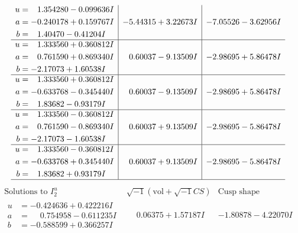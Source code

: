 \documentclass[1p]{elsarticle_modified}
\theoremstyle{definition}
\newcommand{\I}{\sqrt{-1}}
\begin{document}
$$\begin{array}{c|c|c}
\begin{aligned}
u &= \phantom{-}1.354280 - 0.099636 I \\
a &= -0.240178 + 0.159767 I \\
b &= \phantom{-}1.40470 - 0.41204 I\end{aligned}
 & -5.44315 + 3.22673 I & -7.05526 - 3.62956 I \\ \hline\begin{aligned}
u &= \phantom{-}1.333560 + 0.360812 I \\
a &= \phantom{-}0.761590 + 0.869340 I \\
b &= -2.17073 + 1.60538 I\end{aligned}
 & \phantom{-}0.60037 - 9.13509 I & -2.98695 + 5.86478 I \\ \hline\begin{aligned}
u &= \phantom{-}1.333560 + 0.360812 I \\
a &= -0.633768 - 0.345440 I \\
b &= \phantom{-}1.83682 - 0.93179 I\end{aligned}
 & \phantom{-}0.60037 - 9.13509 I & -2.98695 + 5.86478 I \\ \hline\begin{aligned}
u &= \phantom{-}1.333560 - 0.360812 I \\
a &= \phantom{-}0.761590 - 0.869340 I \\
b &= -2.17073 - 1.60538 I\end{aligned}
 & \phantom{-}0.60037 + 9.13509 I & -2.98695 - 5.86478 I \\ \hline\begin{aligned}
u &= \phantom{-}1.333560 - 0.360812 I \\
a &= -0.633768 + 0.345440 I \\
b &= \phantom{-}1.83682 + 0.93179 I\end{aligned}
 & \phantom{-}0.60037 + 9.13509 I & -2.98695 - 5.86478 I\\
 \hline 
 \end{array}$$\newpage$$\begin{array}{c|c|c}  
\text{Solutions to }I^u_{2}& \I (\text{vol} + \sqrt{-1}CS) & \text{Cusp shape}\\
 \hline 
\begin{aligned}
u &= -0.424636 + 0.422216 I \\
a &= \phantom{-}0.754958 - 0.611235 I \\
b &= -0.588599 + 0.366257 I\end{aligned}
 & \phantom{-}0.06375 + 1.57187 I & -1.80878 - 4.22070 I \\ \hline\begin{aligned}

\end{aligned}
\end{array}$$
\end{document}
